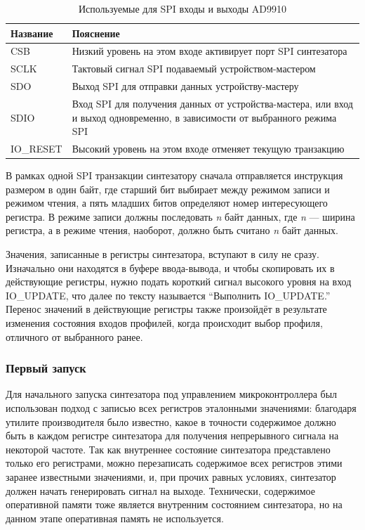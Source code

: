 \documentclass[rusmathsym, eqnumwithinsec, amspack, hyperref]{bomgost}
\begin{document}
\begin{table}[H]
\centering
\caption{Используемые для SPI входы и выходы AD9910}
\label{tab:spi_pins}
\begin{tabular}{|p{4cm}|p{8cm}|}
\hline 
\textbf{Название} & \textbf{Пояснение} \\ 
\hline 
CSB & Низкий уровень на этом входе активирует порт SPI синтезатора \\ 
\hline
SCLK & Тактовый сигнал SPI подаваемый устройством-мастером \\
\hline
SDO & Выход SPI для отправки данных устройству-мастеру \\
\hline
SDIO & Вход SPI для получения данных от устройства-мастера, или вход и выход одновременно, в зависимости от выбранного режима SPI \\
\hline 
IO\_RESET & Высокий уровень на этом входе отменяет текущую транзакцию \\
\hline
\end{tabular} 
\end{table}

В рамках одной SPI транзакции синтезатору сначала отправляется инструкция размером в один байт, где старший бит выбирает между режимом записи и режимом чтения, а пять младших битов определяют номер интересующего регистра. В режиме записи должны последовать {\em n} байт данных, где {\em n} --- ширина регистра, а в режиме чтения, наоборот, должно быть считано {\em n} байт данных.

Значения, записанные в регистры синтезатора, вступают в силу не сразу. Изначально они находятся в буфере ввода-вывода, и чтобы скопировать их в действующие регистры, нужно подать короткий сигнал высокого уровня на вход IO\_UPDATE, что далее по тексту называется ``Выполнить IO\_UPDATE.'' Перенос значений в действующие регистры также произойдёт в результате изменения состояния входов профилей, когда происходит выбор профиля, отличного от выбранного ранее.

\subsubsection{Первый запуск}

Для начального запуска синтезатора под управлением микроконтроллера был использован подход с записью всех регистров эталонными значениями: благодаря утилите производителя было известно, какое в точности содержимое должно быть в каждом регистре синтезатора для получения непрерывного сигнала на некоторой частоте. Так как внутреннее состояние синтезатора представлено только его регистрами, можно перезаписать содержимое всех регистров этими заранее известными значениями, и, при прочих равных условиях, синтезатор должен начать генерировать сигнал на выходе. Технически, содержимое оперативной памяти тоже является внутренним состоянием синтезатора, но на данном этапе оперативная память не используется.
\end{document}
